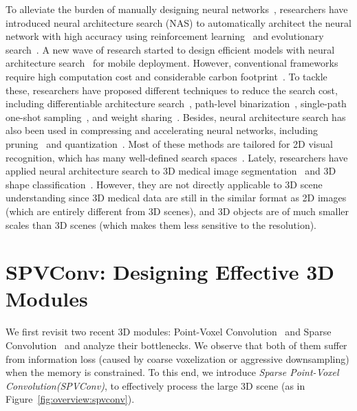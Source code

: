 \documentclass[runningheads]{llncs}
\newcommand{\fig}[1]{Figure~\ref{#1}}
\def\module{Sparse Point-Voxel Convolution\xspace}
\def\moduleshort{SPVConv\xspace}
\begin{document}
To alleviate the burden of manually designing neural networks~\cite{howard2017mobilenets,sandler2018mobilenetv2,ma2018shufflenet,zhang2018shufflenet,iandola2016squeezenet}, researchers have introduced neural architecture search (NAS) to automatically architect the neural network with high accuracy using reinforcement learning~\cite{zoph2017neural,zoph2018learning} and evolutionary search~\cite{liu2019progressive}. A new wave of research started to design efficient models with neural architecture search~\cite{tan2019mnasnet,wu2019fbnet,tan2019efficientnet} for mobile deployment. However, conventional frameworks require high computation cost and considerable carbon footprint~\cite{strubell2019energy}. To tackle these, researchers have proposed different techniques to reduce the search cost, including differentiable architecture search~\cite{liu2019darts}, path-level binarization~\cite{cai2019proxylessnas}, single-path one-shot sampling~\cite{guo2019single,chen2019detnas,cai2020once}, and weight sharing~\cite{stamoulis2019single,cai2020once,wang2020hat}. Besides, neural architecture search has also been used in compressing and accelerating neural networks, including pruning~\cite{he2018amc,liu2019metapruning,cai2019automl,li2020gan} and quantization~\cite{wang2019haq,guo2019single,wang2020hardware,wang2020apq}. Most of these methods are tailored for 2D visual recognition, which has many well-defined search spaces~\cite{radosavovic2019on}. Lately, researchers have applied neural architecture search to 3D medical image segmentation~\cite{zhu2019vnas,kim2019scalable,yang2019searching,bae2019resource,wong2019segnas3d,yu2020c2fnas} and 3D shape classification~\cite{ma2020auto,li2020sgas}. However, they are not directly applicable to 3D scene understanding since 3D medical data are still in the similar format as 2D images (which are entirely different from 3D scenes), and 3D objects are of much smaller scales than 3D scenes (which makes them less sensitive to the resolution). \section{\moduleshort: Designing Effective 3D Modules}

We first revisit two recent 3D modules: Point-Voxel Convolution~\cite{liu2019point} and Sparse Convolution~\cite{choy20194d} and analyze their bottlenecks. We observe that both of them suffer from information loss (caused by coarse voxelization or aggressive downsampling) when the memory is constrained. To this end, we introduce \emph{\module (\moduleshort)}, to effectively process the large 3D scene (as in \fig{fig:overview:spvconv}).
\end{document}
